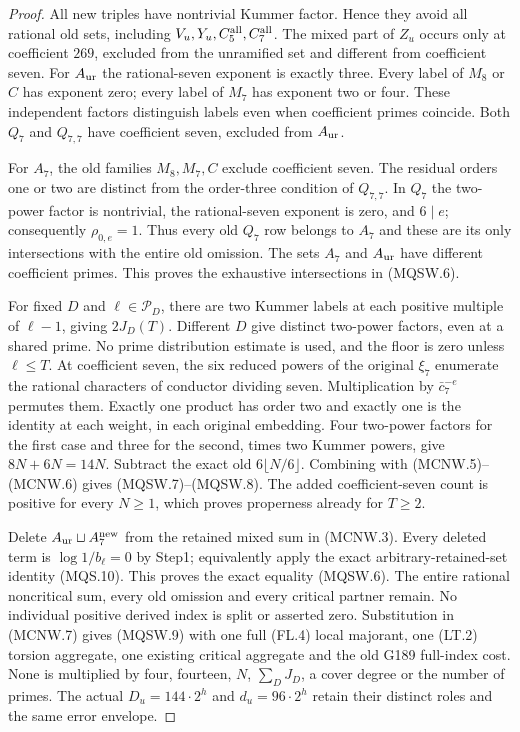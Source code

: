 \begin{proof}
All new triples have nontrivial Kummer factor. Hence they avoid all
rational old sets, including $V_u,Y_u,C_5^{\rm all},C_7^{\rm all}$.
The mixed part of $Z_u$ occurs only at coefficient $269$, excluded
from the unramified set and different from coefficient seven.
For $A_{\rm ur}$ the rational-seven exponent is exactly three.
Every label of $M_8$ or $C$ has exponent zero; every label of $M_7$
has exponent two or four. These independent factors distinguish
labels even when coefficient primes coincide. Both $Q_7$ and
$Q_{7,7}$ have coefficient seven, excluded from $A_{\rm ur}$.

For $A_7$, the old families $M_8,M_7,C$ exclude coefficient seven.
The residual orders one or two are distinct from the order-three
condition of $Q_{7,7}$. In $Q_7$ the two-power factor is nontrivial,
the rational-seven exponent is zero, and $6\mid e$; consequently
$\rho_{0,e}=1$. Thus every old $Q_7$ row belongs to $A_7$ and
these are its only intersections with the entire old omission.
The sets $A_7$ and $A_{\rm ur}$ have different coefficient primes.
This proves the exhaustive intersections in (MQSW.6).

For fixed $D$ and $\ell\in\mathscr P_D$, there are two Kummer
labels at each positive multiple of $\ell-1$, giving $2J_D(T)$.
Different $D$ give distinct two-power factors, even at a shared prime.
No prime distribution estimate is used, and the floor is zero unless
$\ell\leq T$. At coefficient seven, the six reduced powers of the
original $\xi_7$ enumerate the rational characters of conductor
dividing seven. Multiplication by $\bar c_7^{-e}$ permutes them.
Exactly one product has order two and exactly one is the identity
at each weight, in each original embedding. Four two-power factors
for the first case and three for the second, times two Kummer powers,
give $8N+6N=14N$. Subtract the exact old $6\lfloor N/6\rfloor$.
Combining with (MCNW.5)--(MCNW.6) gives (MQSW.7)--(MQSW.8).
The added coefficient-seven count is positive for every $N\geq1$,
which proves properness already for $T\geq2$.

Delete $A_{\rm ur}\sqcup A_7^{\rm new}$ from the retained mixed
sum in (MCNW.3). Every deleted term is $\log1/b_\ell=0$ by Step1;
equivalently apply the exact arbitrary-retained-set identity (MQS.10).
This proves the exact equality (MQSW.6). The entire rational
noncritical sum, every old omission and every critical partner remain.
No individual positive derived index is split or asserted zero.
Substitution in (MCNW.7) gives (MQSW.9) with one full (FL.4)
local majorant, one (LT.2) torsion aggregate, one existing critical
aggregate and the old G189 full-index cost. None is multiplied by
four, fourteen, $N$, $\sum_DJ_D$, a cover degree or the number of primes.
The actual $D_u=144\cdot2^h$ and $d_u=96\cdot2^h$ retain their
distinct roles and the same error envelope.


\end{proof}
